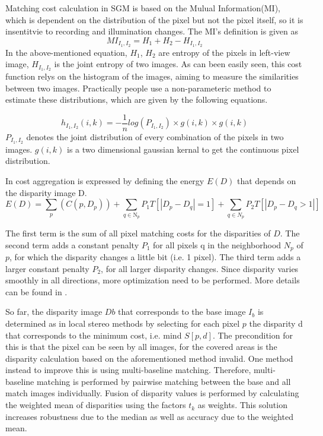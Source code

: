 Matching cost calculation in SGM is based on the Mulual Information(MI), which is dependent on the distribution of the pixel but not the pixel itself, so it is insentitvie to recording and illumination changes. The MI's definition is given as
\begin{equation}
    MI_{I_1, I_2} = H_1 + H_2 - H_{I_1, I_2}
\end{equation}
In the above-mentioned equation, $H_1$, $H_2$ are entropy of the pixels in left-view image, $H_{I_1, I_2}$ is the joint entropy of two images. As can been easily seen, this cost function relys on the histogram of the images, aiming to measure the similarities between two images. Practically people use a non-parameteric method to estimate these distributions, which are given by the following equations.

\begin{equation}
    h_{I_1, I_2}(i, k) = -\frac{1}{n}log(P_{I_1, I_2})\times g(i, k) \times g(i, k)
\end{equation}
$P_{I_1, I_2}$ denotes the joint distribution of every combination of the pixels in two images. $g(i, k)$ is a two dimensional gaussian kernal to get the continuous pixel distribution. 

In cost aggregation is expressed by defining the energy $E(D)$ that depends on the disparity image D.
\begin{equation}
    E(D) = \sum_p(C(p, D_p))+\sum_{q\in \mathrm{N}_{p}}P_1T[|D_p-D_q|=1]+\sum_{q\in N_p}P_2T[|D_p-D_q>1|]
\end{equation}

The first term is the sum of all pixel matching costs for the disparities of $D$. The second term adds a constant penalty $P_1$ for all pixels q in the neighborhood $N_p$ of $p$, for which the disparity changes a little bit (i.e. 1 pixel). The third term adds a larger constant penalty $P_2$, for all larger disparity changes. Since disparity varies smoothly in all directions, more optimization need to be performed. More details can be found in \cite{hirschmuller2007stereo}. 


So far, the disparity image $Db$ that corresponds to the base image $I_b$ is determined as in local stereo methods by selecting for each pixel $p$ the disparity d that corresponds to the minimum cost, i.e. mind $S[p, d]$. The precondition for this is that the pixel can be seen by all images, for the covered areas is the disparity calculation based on the aforementioned method invalid. One method instead to improve this is using multi-baseline matching. Therefore, multi-baseline matching is performed by pairwise matching between the base and all match images individually.
Fusion of disparity values is performed by calculating the weighted mean of disparities using the factors $t_k$ as weights. This solution increases robustness due to the median as well as accuracy due to the weighted mean. 



